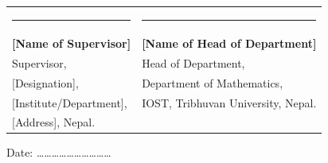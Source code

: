 \vspace{0.8cm}

\noindent
\begin{tabular}{@{}p{7.5cm}p{7cm}@{}}
\rule{5.5cm}{0.4pt}
    & \rule{5.5cm}{0.4pt} \\[0.3cm]
\textbf{{[Name of Supervisor]}}
    & \textbf{{[Name of Head of Department]}} \\[0.1cm]
Supervisor,
    & Head of Department, \\[0.1cm]
{[Designation]},
    & Department of Mathematics, \\
{[Institute/Department]},
    & IOST, Tribhuvan University, Nepal. \\
{[Address]}, Nepal.
    & \\
\end{tabular}

\vspace{0.8cm}

\noindent
Date: \ldots\ldots\ldots\ldots\ldots\ldots\ldots\ldots\ldots\ldots